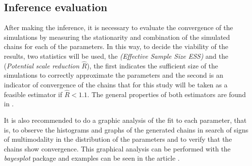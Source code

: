 \subsection{Inference evaluation}
%
After making the inference, it is necessary to evaluate the convergence of the simulations by measuring the stationarity and combination of the simulated chains for each of the parameters. In this way, to decide the viability of the results, two statistics will be used, the \textit{(Effective Sample Size ESS)} and the (\textit{Potential scale reduction} $\hat{R}$), the first indicates the sufficient size of the simulations to correctly approximate the parameters and the second is an indicator of convergence of the chains that for this study will be taken as a feasible estimator if $\hat{R}<1.1$. The general properties of both estimators are found in \cite{BDA}.

It is also recommended to do a graphic analysis of the fit to each parameter, that is, to observe the histograms and graphs of the generated chains in search of signs of multimodality in the distribution of the parameters and to verify that the chains show convergence. This graphical analysis can be performed with the \textit{bayesplot} \cite{bayesplot} package and examples can be seen in the article \citet{visualization}.
%
